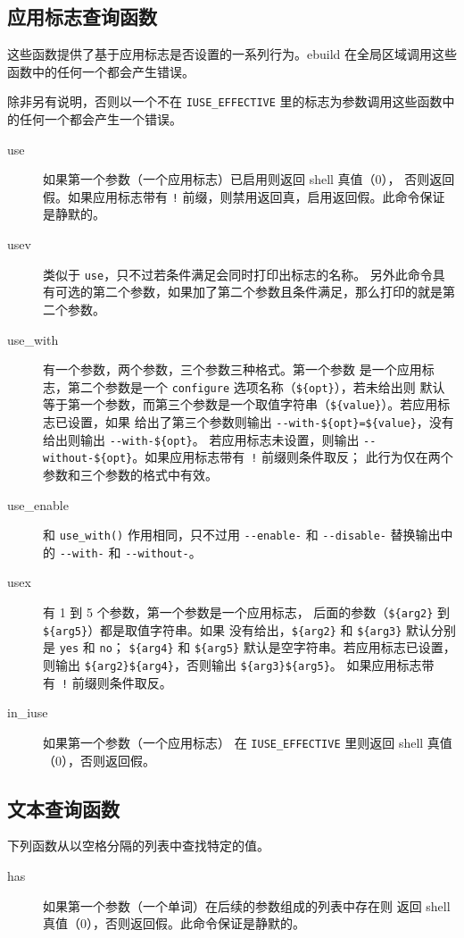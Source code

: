 \subsection{应用标志查询函数}
这些函数提供了基于应用标志是否设置的一系列行为。ebuild 在全局区域调用这些函数中的任何一个都会产生错误。

除非另有说明，否则以一个不在 \texttt{IUSE_EFFECTIVE} 里的标志为参数调用这些函数中的任何一个都会产生一个错误。

\begin{description}
\item[use] 如果第一个参数（一个应用标志）已启用则返回 shell 真值（0），
    否则返回假。如果应用标志带有 \texttt{!} 前缀，则禁用返回真，启用返回假。此命令保证是静默的。
\item[usev] 类似于 \texttt{use}，只不过若条件满足会同时打印出标志的名称。
    另外此命令具有可选的第二个参数，如果加了第二个参数且条件满足，那么打印的就是第二个参数。
\item[use_with] 有一个参数，两个参数，三个参数三种格式。第一个参数
    是一个应用标志，第二个参数是一个 \texttt{configure} 选项名称（\texttt{\$\{opt\}}）\hspace{0em}，若未给出则
    默认等于第一个参数，而第三个参数是一个取值字符串（\texttt{\$\{value\}}）\hspace{0em}。若应用标志已设置，如果
    给出了第三个参数则输出 \texttt{-{}-with-\$\{opt\}=\$\{value\}}，没有给出则输出 \texttt{-{}-with-\$\{opt\}}。
    若应用标志未设置，则输出 \texttt{-{}-without-\$\{opt\}}。如果应用标志带有~\texttt{!} 前缀则条件取反；
    此行为仅在两个参数和三个参数的格式中有效。
\item[use_enable] 和 \texttt{use_with()} 作用相同，只不过用 \texttt{-{}-enable-} 和
    \texttt{-{}-disable-} 替换输出中的 \texttt{-{}-with-} 和 \texttt{-{}-without-}。
\item[usex] 有 1 到 5 个参数，第一个参数是一个应用标志，
    后面的参数（\texttt{\$\{arg2\}} 到 \texttt{\$\{arg5\}}）都是取值字符串。如果
    没有给出，\texttt{\$\{arg2\}} 和 \texttt{\$\{arg3\}} 默认分别是 \texttt{yes} 和 \texttt{no}；
    \texttt{\$\{arg4\}} 和 \texttt{\$\{arg5\}} 默认是空字符串。若应用标志已设置，
    则输出 \texttt{\$\{arg2\}\$\{arg4\}}，否则输出 \texttt{\$\{arg3\}\$\{arg5\}}。
    如果应用标志带有~\texttt{!} 前缀则条件取反。
\item[in_iuse] 如果第一个参数（一个应用标志）
    在 \texttt{IUSE_EFFECTIVE} 里则返回 shell 真值（0），否则返回假。
\end{description}

\subsection{文本查询函数}
下列函数从以空格分隔的列表中查找特定的值。
\begin{description}
\item[has] 如果第一个参数（一个单词）在后续的参数组成的列表中存在则
    返回 shell 真值（0），否则返回假。此命令保证是静默的。
\end{description}

